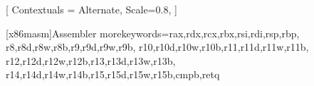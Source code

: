 \usepackage{xcolor}
\usepackage{listings}
\usepackage[cache=false]{minted}

\usepackage{fontspec}
\setmonofont{JetBrains Mono}[
    Contextuals = Alternate,
    Scale=0.8,
]

\usepackage{listings}
\lstset{
    basicstyle = \ttfamily,
    columns = flexible,
}
\makeatletter
\renewcommand*\verbatim@nolig@list{}
\makeatother



\newcommand{\clang}{\lstset{language=C,
        basicstyle=\ttfamily,
        keywordstyle=\color{blue}\ttfamily,
        stringstyle=\color{green}\ttfamily,
        commentstyle=\color{gray},
        morecomment=[l][\color{gray}]{\#},
        numberstyle=\tiny\color{orange},
        breaklines=true,
}}

\newcommand{\shell}{\lstset{
    language=,
    basicstyle=\ttfamily,
    stringstyle=\color{black}\ttfamily,
}}


   [x86masm]{Assembler} %
   {morekeywords={rax,rdx,rcx,rbx,rsi,rdi,rsp,rbp, %
                  r8,r8d,r8w,r8b,r9,r9d,r9w,r9b, %
                  r10,r10d,r10w,r10b,r11,r11d,r11w,r11b, %
                  r12,r12d,r12w,r12b,r13,r13d,r13w,r13b, %
                  r14,r14d,r14w,r14b,r15,r15d,r15w,r15b,cmpb,retq}} %


\newcommand{\asm}{\lstset{
    language=[x64]Assembler,
    morecomment=[l][\color{gray}]{\#},
    keywordstyle=\color{blue}\ttfamily,
}}



\newcommand{\ml}[1]{\texttt{#1}}
\newcommand{\cc}[1]{\texttt{#1}}


\let\olditemize=\itemize \let\endolditemize=\enditemize \renewenvironment{itemize}{\olditemize \itemsep0em}{\endolditemize}
